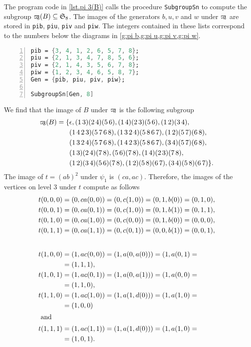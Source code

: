 The program code in \cref{lst.pi 3(B)} calls the procedure \verb+SubgroupSn+ to compute the subgroup $\varpi\hspace{-0.4em}_3(B)\subseteq\mathfrak{S}_8$. The images of the generators $b,u,v$ and $w$ under $\varpi\hspace{-0.4em}_3$ are stored in \verb+pib+, \verb+piu+, \verb+piv+ and \verb+piw+. The integers contained in these lists correspond to the numbers below the diagrams in \cref{g:pi b,g:pi u,g:pi v,g:pi w}.
\begin{lstlisting}[float, caption=Computing $\varpikern_3(B)\subseteq\mathfrak{S}_8$,
                   label=lst.pi 3(B),
                   language=Mathematica, 
                   numbers=left,
                   numberstyle=\tiny,
                   stepnumber=2,
                   numbersep=5pt]
pib = {3, 4, 1, 2, 6, 5, 7, 8};
piu = {2, 1, 3, 4, 7, 8, 5, 6};
piv = {2, 1, 4, 3, 5, 6, 7, 8};
piw = {1, 2, 3, 4, 6, 5, 8, 7};
Gen = {pib, piu, piv, piw};

SubgroupSn[Gen, 8]
\end{lstlisting}
We find that the image of $B$ under $\varpi\hspace{-0.4em}_3$ is the following subgroup
\begin{align*}
\varpi\hspace{-0.4em}_3(B)=\lbrace	&\epsilon,(1\, 3)(2\, 4)(5\, 6),   (1\, 4)(2\, 3)(5\, 6), (1\, 2)(3\, 4),\\
                    & (1\, 4\, 2\, 3)(5\, 7\, 6\, 8),	(1\, 3\, 2\, 4)(5\, 8\, 6\, 7),   (1\, 2)(5\, 7)(6\, 8),\\
                    & (1\, 3\, 2\, 4)(5\, 7\, 6\, 8),	(1\, 4\, 2\, 3)(5\, 8\, 6\, 7),   (3\, 4)(5\, 7)(6\, 8),\\
                    & (1\, 3)(2\, 4)(7\, 8),   (5\, 6)(7\, 8), 
                    (1\, 4)(2\, 3)(7\, 8),\\
                    & (1\, 2)(3\, 4)(5\, 6)(7\, 8),   (1\, 2)(5\, 8)(6\, 7), (3\, 4)(5\, 8)(6\, 7)\rbrace.
\end{align*}
The image of $t=(ab)^2$ under $\psi_1$ is $(ca,ac)$. Therefore, the images of the vertices on level 3 under $t$ compute as follows
\begin{align*}
t(0,0,0)&=(0,ca(0,0))=(0,c(1,0))=(0,1,b(0))=(0,1,0),\\
t(0,0,1)&=(0,ca(0,1))=(0,c(1,0))=(0,1,b(1))=(0,1,1),\\
t(0,1,0)&=(0,ca(1,0))=(0,c(0,0))=(0,1,b(0))=(0,0,0),\\
t(0,1,1)&=(0,ca(1,1))=(0,c(0,1))=(0,0,b(1))=(0,0,1),\\[2em]
t(1,0,0)&=(1,ac(0,0))=(1,a(0,a(0)))=(1,a(0,1)=\\
        &=(1,1,1),\\
t(1,0,1)&=(1,ac(0,1))=(1,a(0,a(1)))=(1,a(0,0)=\\
        &=(1,1,0),\\
t(1,1,0)&=(1,ac(1,0))=(1,a(1,d(0)))=(1,a(1,0)=\\
        &=(1,0,0)\\
\intertext{ and}
t(1,1,1)&=(1,ac(1,1))=(1,a(1,d(0)))=(1,a(1,0)=\\
        &=(1,0,1).
\end{align*}
